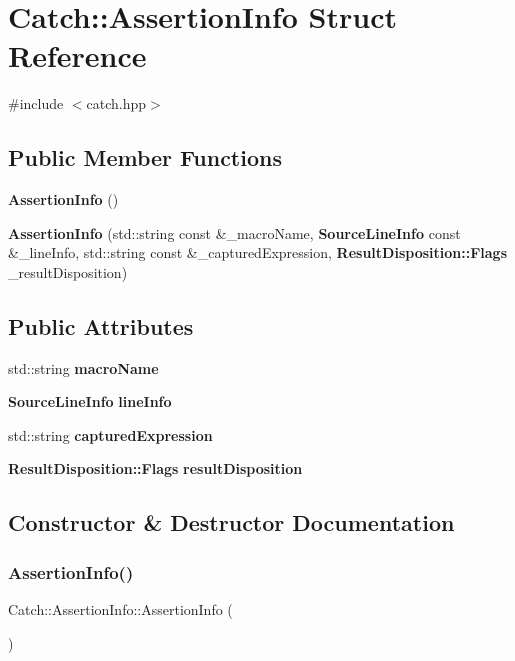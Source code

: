 \section{Catch\+:\+:Assertion\+Info Struct Reference}
\label{struct_catch_1_1_assertion_info}


{\ttfamily \#include $<$catch.\+hpp$>$}

\subsection*{Public Member Functions}
\begin{DoxyCompactItemize}
\item 
\textbf{ Assertion\+Info} ()
\item 
\textbf{ Assertion\+Info} (std\+::string const \&\+\_\+macro\+Name, \textbf{ Source\+Line\+Info} const \&\+\_\+line\+Info, std\+::string const \&\+\_\+captured\+Expression, \textbf{ Result\+Disposition\+::\+Flags} \+\_\+result\+Disposition)
\end{DoxyCompactItemize}
\subsection*{Public Attributes}
\begin{DoxyCompactItemize}
\item 
std\+::string \textbf{ macro\+Name}
\item 
\textbf{ Source\+Line\+Info} \textbf{ line\+Info}
\item 
std\+::string \textbf{ captured\+Expression}
\item 
\textbf{ Result\+Disposition\+::\+Flags} \textbf{ result\+Disposition}
\end{DoxyCompactItemize}


\subsection{Constructor \& Destructor Documentation}
\mbox{\label{struct_catch_1_1_assertion_info_a15c29d306c86361f842a0351a6003b9f}} 
\subsubsection{Assertion\+Info()\hspace{0.1cm}{\footnotesize\ttfamily [1/2]}}
{\footnotesize\ttfamily Catch\+::\+Assertion\+Info\+::\+Assertion\+Info (\begin{DoxyParamCaption}{ }\end{DoxyParamCaption})\hspace{0.3cm}{\ttfamily [inline]}}

